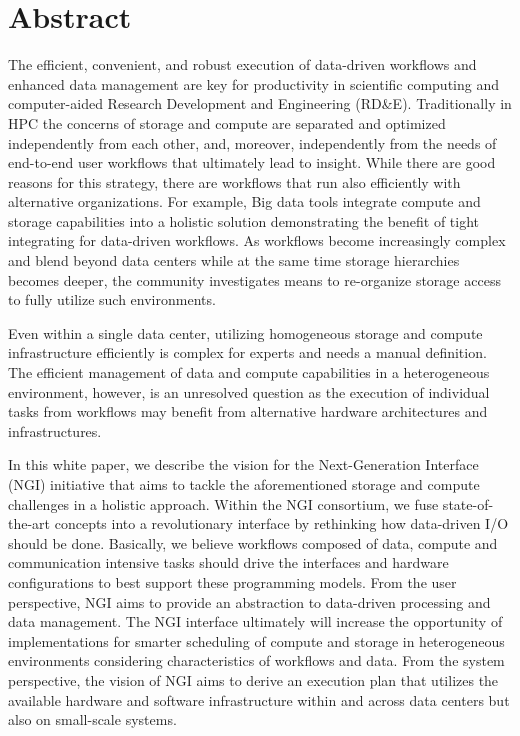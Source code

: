 \documentclass[a4paper, twocolumn]{article}
\title{\papertitle}
\author{Julian M. Kunkel
  \textit{University of Reading}
	\and
  Chris Hoffman
  \textit{National Center for Atmospheric Research}
  \and
  Andy Poling
  \textit{Kove}
  \and
  Jay Lofstead \textit{Sandia National Laboratories}
}
\date{\today}
\begin{document}
\maketitle
\thispagestyle{fancy}

\section*{Abstract}
The efficient, convenient, and robust execution of data-driven workflows and enhanced data management are key for productivity in scientific computing and computer-aided Research Development and Engineering (RD\&E).
Traditionally in HPC the concerns of storage and compute are separated and optimized independently from each other, and, moreover, independently from the needs of end-to-end user workflows that ultimately lead to insight.
While there are good reasons for this strategy, there are workflows that run also efficiently with alternative organizations.
For example, Big data tools integrate compute and storage capabilities into a holistic solution demonstrating the benefit of tight integrating for data-driven workflows.
As workflows become increasingly complex and blend beyond data centers while at the same time storage hierarchies becomes deeper, the community investigates means to re-organize storage access to fully utilize such environments.


Even within a single data center, utilizing homogeneous storage and compute infrastructure efficiently is complex for experts and needs a manual definition.
The efficient management of data and compute capabilities in a heterogeneous environment, however, is an unresolved question as the execution of individual tasks from workflows may benefit from alternative hardware architectures and infrastructures.

In this white paper, we describe the vision for the Next-Generation Interface (NGI) initiative that aims to tackle the aforementioned storage and compute challenges in a holistic approach.
Within the NGI consortium, we fuse state-of-the-art concepts into a revolutionary interface by rethinking how data-driven I/O should be done.
Basically, we believe workflows composed of data, compute and communication intensive tasks should drive the interfaces and hardware configurations to best support these programming models.
From the user perspective, NGI aims to provide an abstraction to data-driven processing and data management.
The NGI interface ultimately will increase the opportunity of implementations for smarter scheduling of compute and storage in heterogeneous environments considering characteristics of workflows and data.
From the system perspective, the vision of NGI aims to derive an execution plan that utilizes the available hardware and software infrastructure within and across data centers but also on small-scale systems.
\end{document}
